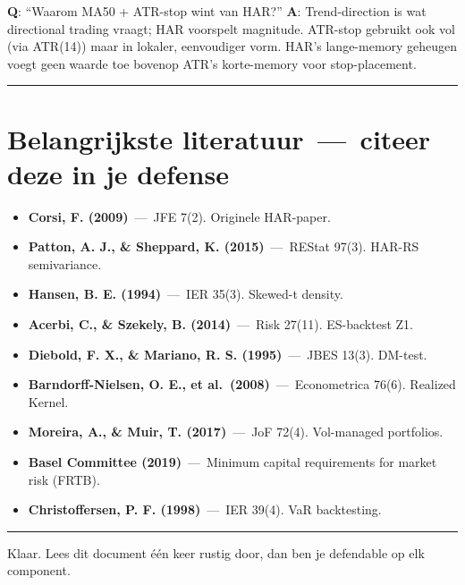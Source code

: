 \textbf{Q}: ``Waarom MA50 + ATR-stop wint van HAR?''
\textbf{A}: Trend-direction is wat directional trading vraagt; HAR voorspelt magnitude. ATR-stop gebruikt ook vol (via ATR(14)) maar in lokaler, eenvoudiger vorm. HAR's lange-memory geheugen voegt geen waarde toe bovenop ATR's korte-memory voor stop-placement.

\begin{center}\rule{0.5\linewidth}{0.5pt}\end{center}

\hypertarget{belangrijkste-literatuur-citeer-deze-in-je-defense}{%
\section{Belangrijkste literatuur \,---\, citeer deze in je defense}\label{belangrijkste-literatuur-citeer-deze-in-je-defense}}

\begin{itemize}
\tightlist
\item
  \textbf{Corsi, F. (2009)} \,---\, JFE 7(2). Originele HAR-paper.
\item
  \textbf{Patton, A. J., \& Sheppard, K. (2015)} \,---\, REStat 97(3). HAR-RS semivariance.
\item
  \textbf{Hansen, B. E. (1994)} \,---\, IER 35(3). Skewed-t density.
\item
  \textbf{Acerbi, C., \& Szekely, B. (2014)} \,---\, Risk 27(11). ES-backtest Z1.
\item
  \textbf{Diebold, F. X., \& Mariano, R. S. (1995)} \,---\, JBES 13(3). DM-test.
\item
  \textbf{Barndorff-Nielsen, O. E., et al.~(2008)} \,---\, Econometrica 76(6). Realized Kernel.
\item
  \textbf{Moreira, A., \& Muir, T. (2017)} \,---\, JoF 72(4). Vol-managed portfolios.
\item
  \textbf{Basel Committee (2019)} \,---\, Minimum capital requirements for market risk (FRTB).
\item
  \textbf{Christoffersen, P. F. (1998)} \,---\, IER 39(4). VaR backtesting.
\end{itemize}

\begin{center}\rule{0.5\linewidth}{0.5pt}\end{center}

Klaar. Lees dit document één keer rustig door, dan ben je defendable op elk component.
